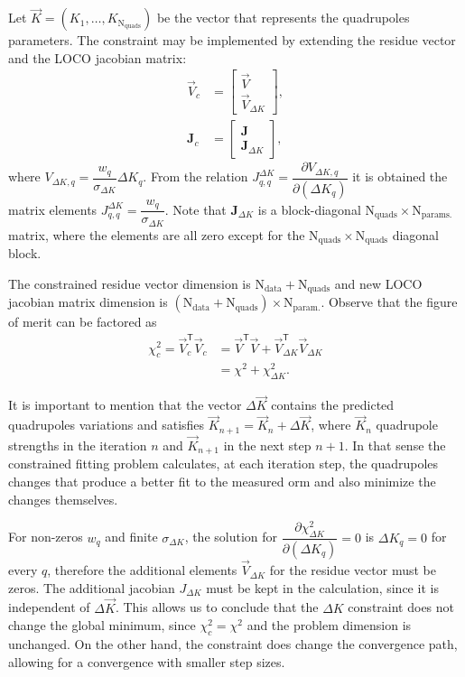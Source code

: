 Let $\vec{K} = \left(K_1, \ldots, K_{\mathrm{N}_{\mathrm{quads}}}\right)$ be the vector that represents the quadrupoles parameters. The constraint may be implemented by extending the residue vector and the LOCO jacobian matrix:
\begin{align}
    \vec{V}_c &= \begin{bmatrix}
    \vec{V} \\
    \vec{V}_{\Delta K}
    \end{bmatrix}, \\
    \mathbf{J}_c &= 
    \begin{bmatrix}
    \mathbf{J} \\
    \mathbf{J}_{\Delta K}
    \end{bmatrix},
\end{align}
where $V_{\Delta K, q} = \dfrac{w_q}{\sigma_{\Delta K}}\Delta K_q$. From the relation $J_{q, q}^{\Delta K} = \dfrac{\partial V_{\Delta K, q}}{\partial \left(\Delta K_q\right)}$ it is obtained the matrix elements $J_{q, q}^{\Delta K} = \dfrac{w_q}{\sigma_{\Delta K}}$. Note that $\mathbf{J}_{\Delta K}$ is a block-diagonal $\mathrm{N}_{\mathrm{quads}} \times \mathrm{N}_{\mathrm{params.}}$ matrix, where the elements are all zero except for the $\mathrm{N}_{\mathrm{quads}} \times \mathrm{N}_{\mathrm{quads}}$ diagonal block.

The constrained residue vector dimension is $\mathrm{N}_{\mathrm{data}} + \mathrm{N}_{\mathrm{quads}}$ and new LOCO jacobian matrix dimension is $\left(\mathrm{N}_{\mathrm{data}} + \mathrm{N}_{\mathrm{quads}}\right) \times \mathrm{N}_{\mathrm{param.}}$. Observe that the figure of merit can be factored as
\begin{align*}
    \chi_c^2 = \vec{V}_c^{\mathsf{T}}\vec{V}_c &= \vec{V}^{\mathsf{T}}\vec{V} + \vec{V}_{\Delta K}^{\mathsf{T}}\vec{V}_{\Delta K} \\ 
    &= \chi^2 + \chi^2_{\Delta K}.
\end{align*}

It is important to mention that the vector $\Delta \vec{K}$ contains the predicted quadrupoles variations and satisfies $\vec{K}_{n+1} = \vec{K}_n + \Delta \vec{K}$, where $\vec{K}_n$ quadrupole strengths in the iteration $n$ and $\vec{K}_{n+1}$ in the next step $n+1$. In that sense the constrained fitting problem calculates, at each iteration step, the quadrupoles changes that produce a better fit to the measured \gls{orm} and also minimize the changes themselves. 

For non-zeros $w_q$ and finite $\sigma_{\Delta K}$, the solution for $\dfrac{\partial \chi^2_{\Delta K}}{\partial \left(\Delta K_q\right)} = 0$ is $\Delta K_q = 0$ for every $q$, therefore the additional elements $\vec{V}_{\Delta K}$ for the residue vector must be zeros. The additional jacobian $J_{\Delta K}$ must be kept in the calculation, since it is independent of $\Delta \vec{K}$. This allows us to conclude that the $\Delta K$ constraint does not change the global minimum, since $\chi^2_c = \chi^2$ and the problem dimension is unchanged. On the other hand, the constraint does change the convergence path, allowing for a convergence with smaller step sizes.

